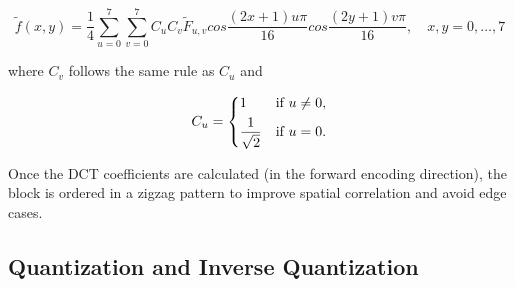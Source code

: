 \documentclass[11pt,a4paper]{article}
\begin{document}
\begin{equation}
\tilde{f}(x,y) = \frac{1}{4}  \sum_{u=0}^{7} \sum_{v=0}^{7} C_u C_v
\tilde{F}_{u,v} cos\frac{(2x+1)u\pi}{16} cos\frac{(2y+1)v\pi}{16}, \quad x,y=0,\ldots ,7
\end{equation}

where $C_v$ follows the same rule as $C_u$ and

\begin{align*}
C_u = 
	\begin{dcases}
		1 \quad &\text{if $u\neq 0$,} \\
		\frac{1}{\sqrt{2}} &\text{if $u = 0$.}
	\end{dcases}
\end{align*}

Once the DCT coefficients are calculated (in the forward encoding direction), the block is ordered in a zigzag pattern to improve spatial correlation and avoid edge cases. 

\subsection{Quantization and Inverse Quantization}
\end{document}
